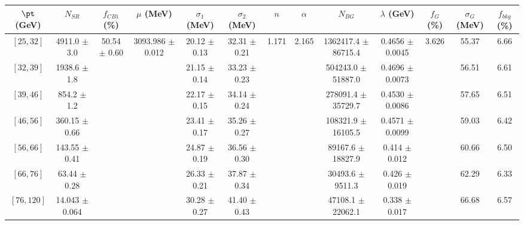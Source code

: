\begin{tabular}{c||c|c|c|c|c|c|c|c|c|c|c||c}
$\pt$ (GeV) & $N_{SR}$ & $f_{CB1}$ (\%) & $\mu$ (MeV) & $\sigma_1$ (MeV) & $\sigma_2$ (MeV) & $n$ & $\alpha$ & $N_{BG}$ & $\lambda$ (GeV) & $f_G$ (\%) & $\sigma_G$ (MeV) & $f_{bkg}$ (\%) \\
\hline
$[25, 32]$ & 4911.0 $\pm$ 3.0 & \multirow{7}{*}{50.54 $\pm$ 0.60} & \multirow{7}{*}{3093.986 $\pm$ 0.012} & 20.12 $\pm$ 0.13 & 32.31 $\pm$ 0.21 & \multirow{7}{*}{1.171} & \multirow{7}{*}{2.165} & 1362417.4 $\pm$ 86715.4 & 0.4656 $\pm$ 0.0045 & \multirow{7}{*}{3.626} & 55.37 & 6.66\\
$[32, 39]$ & 1938.6 $\pm$ 1.8 &  &  & 21.15 $\pm$ 0.14 & 33.23 $\pm$ 0.23 &  &  & 504243.0 $\pm$ 51887.0 & 0.4696 $\pm$ 0.0073 &  & 56.51 & 6.61\\
$[39, 46]$ & 854.2 $\pm$ 1.2 &  &  & 22.17 $\pm$ 0.15 & 34.14 $\pm$ 0.24 &  &  & 278091.4 $\pm$ 35729.7 & 0.4530 $\pm$ 0.0086 &  & 57.65 & 6.51\\
$[46, 56]$ & 360.15 $\pm$ 0.66 &  &  & 23.41 $\pm$ 0.17 & 35.26 $\pm$ 0.27 &  &  & 108321.9 $\pm$ 16105.5 & 0.4571 $\pm$ 0.0099 &  & 59.03 & 6.42\\
$[56, 66]$ & 143.55 $\pm$ 0.41 &  &  & 24.87 $\pm$ 0.19 & 36.56 $\pm$ 0.30 &  &  & 89167.6 $\pm$ 18827.9 & 0.414 $\pm$ 0.012 &  & 60.66 & 6.50\\
$[66, 76]$ & 63.44 $\pm$ 0.28 &  &  & 26.33 $\pm$ 0.21 & 37.87 $\pm$ 0.34 &  &  & 30493.6 $\pm$ 9511.3 & 0.426 $\pm$ 0.019 &  & 62.29 & 6.33\\
$[76, 120]$ & 14.043 $\pm$ 0.064 &  &  & 30.28 $\pm$ 0.27 & 41.40 $\pm$ 0.43 &  &  & 47108.1 $\pm$ 22062.1 & 0.338 $\pm$ 0.017 &  & 66.68 & 6.57\\
\end{tabular}
